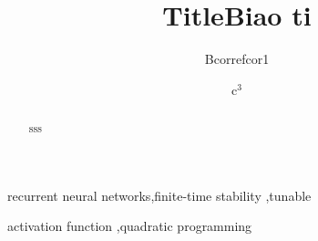 \documentclass[final,5p,times]{elsarticle}
\begin{document}
\begin{frontmatter}








\title{Title}


\author{Bcorref{cor1}} %
\author{c$^3$\corref{}} %


\address{$^1$ } 
\address{$^2$} 
\address{$^3$ }


\title{Biao ti}

\begin{abstract} %

sss
\end{abstract}

\begin{keyword}


recurrent neural networks\sep finite-time stability \sep tunable

activation function \sep quadratic programming


\end{keyword}

\end{frontmatter} %
\end{document}
